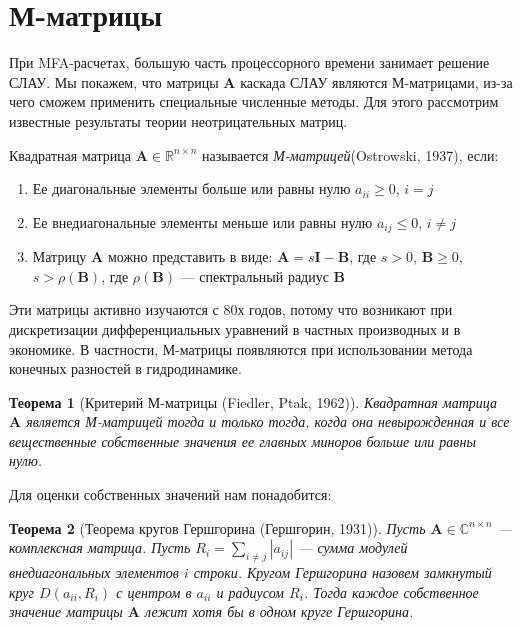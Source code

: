 \documentclass[14pt, a4paper]{extreport}
\begin{document}
\clearpage
\section{М-матрицы}
При MFA-расчетах, большую часть процессорного времени занимает решение СЛАУ. Мы покажем, что матрицы $\mathbf{A}$ каскада СЛАУ являются М-матрицами, из-за чего сможем применить специальные численные методы. Для этого рассмотрим известные результаты теории неотрицательных матриц.

Квадратная матрица $\mathbf{A} \in \mathbb{R}^{n \times n}$ называется \emph{М-матрицей}(Ostrowski, 1937)\cite{m_matrix_orig}, если:
\begin{enumerate}
	\item Ее диагональные элементы больше или равны нулю $a_{ii} \ge 0$, $i = j$
	\item Ее внедиагональные элементы меньше или равны нулю $a_{ij} \le 0$, $i \neq j$
	\item Матрицу $\mathbf{A}$ можно представить в виде: $\mathbf{A} = s\mathbf{I} - \mathbf{B}$, где $s > 0$, $\mathbf{B} \ge 0$, $s > \rho(\mathbf{B})$, где $\rho(\mathbf{B})$ --- спектральный радиус $\mathbf{B}$
\end{enumerate}
Эти матрицы активно изучаются с 80х годов, потому что возникают при дискретизации дифференциальных уравнений в частных производных и в экономике. В частности, М-матрицы появляются при использовании метода конечных разностей в гидродинамике\cite{m_matrix_application_1, m_matrix_application_2,m_matrix_application_3,m_matrix_application_4}.

\newtheorem{theorem}{Теорема}
\begin{theorem}[Критерий М-матрицы (Fiedler, Ptak, 1962)\cite{m_matrix_def}]
	\label{m_matrix_criterion}
	Квадратная матрица $\mathbf{A}$ является М-матрицей тогда и только тогда, когда она невырожденная и все вещественные собственные значения ее главных миноров больше или равны нулю. 	
\end{theorem}

Для оценки собственных значений нам понадобится:
\begin{theorem}[Теорема кругов Гершгорина (Гершгорин, 1931)\cite{circle_theorem}]
	\label{circle_theorem}
	Пусть $\mathbf{A} \in \mathbb{C}^{n \times n}$ --- комплексная матрица. Пусть $R_i = \sum_{i \neq j} |a_{ij}|$ --- сумма модулей внедиагональных элементов $i$ строки. Кругом Гершгорина назовем замкнутый круг $D(a_{ii}, R_i)$ с центром в $a_{ii}$ и радиусом $R_i$. Тогда каждое собственное значение матрицы $\mathbf{A}$ лежит хотя бы в одном круге Гершгорина. 
\end{theorem}
\end{document}
